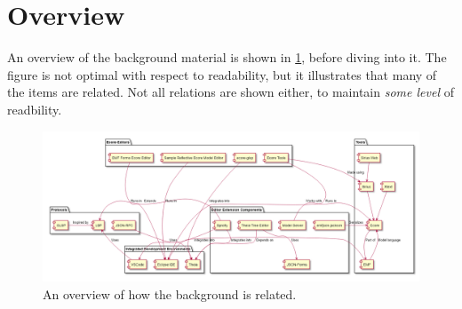 \section{Overview}


An overview of the background material is shown in \cref{fig:background-overview}, before diving into it.
The figure is not optimal with respect to readability, but it illustrates that many of the items are related.
Not all relations are shown either, to maintain \emph{some level} of readbility.

\begin{figure}[htbp]  %
  \centering
  \hspace*{-2cm}%
  \includegraphics[width=1.4\textwidth]{figures/background-overview}
  \caption[Background Overview]{An overview of how the background is related.}\label{fig:background-overview}
\end{figure}